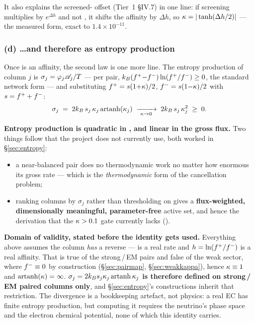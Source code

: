 It also explains the screened-\kap{} offset (Tier~1 \S IV.7) in one line: if
screening multiplies \fp{} by $e^{\Delta h}$ and not \fm, it shifts the affinity
by $\Delta h$, so $\kappa = |\tanh(\Delta h/2)|$ --- the measured form, exact to
$1.4\times10^{-11}$.

\subsubsection{(d) \ldots and therefore \texorpdfstring{\kap}{kappa} as entropy
               production}
\label{sec:kappa-entropy}

Once \kap{} is an affinity, the second law is one more line. The entropy
production of column $j$ is $\sigma_j = \varphi_j\mathscr{A}_j/T$ --- per pair,
$k_{B}(f^{+}{-}f^{-})\ln(f^{+}/f^{-}) \ge 0$, the standard network form
\citep{schnakenberg1976, kondepudi1998} --- and substituting
$f^{+} = s(1{+}\kappa)/2$, $f^{-} = s(1{-}\kappa)/2$ with $s = f^{+} + f^{-}$:
%
\begin{equation}
\sigma_j \;=\; 2k_{B}\,s_j\,\kappa_j\operatorname{artanh}(\kappa_j)
\;\xrightarrow[\ \kappa\to0\ ]{}\; 2k_{B}\,s_j\,\kappa_j^2 \;\ge\; 0 .
\label{eq:entropyprod}
\end{equation}
\derivedhere

\textbf{Entropy production is quadratic in \kap, and linear in the gross flux.}
Two things follow that the project does not currently use, both worked in
\S\ref{sec:entropy}:

\begin{itemize}
\item a near-balanced pair does no thermodynamic work no matter how enormous its
  gross rate --- which is the \emph{thermodynamic} form of the cancellation
  problem;
\item ranking columns by $\sigma_j$ rather than thresholding on \kap{} gives a
  \textbf{flux-weighted, dimensionally meaningful, parameter-free} active set,
  and hence the derivation that the $\kappa > 0.1$ gate currently lacks
  ().
\end{itemize}

\begin{warn}
\textbf{Domain of validity, stated before the identity gets used.} Everything
above assumes the column \emph{has} a reverse --- \fm{} is a real rate and
$h = \ln(f^{+}/f^{-})$ is a real affinity. That is true of the strong\,/\,EM pairs
and false of the weak sector, where $f^{-} \equiv 0$ by construction
(\S\ref{sec:pairmap}, \S\ref{sec:weakkappa}), hence $\kappa \equiv 1$ and
$\operatorname{artanh}(\kappa) = \infty$. \textbf{$\sigma_j = 2k_{B} s_j \kappa_j \operatorname{artanh}\kappa_j$ is
therefore defined on strong\,/\,EM paired columns only}, and
\S\ref{sec:entropy}'s constructions inherit that restriction. The divergence is
a bookkeeping artefact, not physics: a real EC has finite entropy production,
but computing it requires the neutrino's phase space and the electron chemical
potential, none of which this identity carries.
\end{warn}

